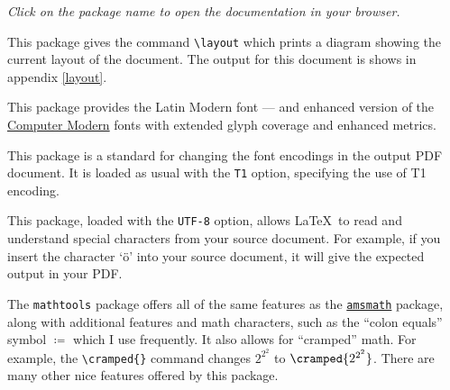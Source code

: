 \documentclass[letterpaper,12pt]{article}
\begin{document}
\begin{center}
\textsl{Click on the package name to open the documentation in your browser.}
\end{center}

\bigskip

\begin{description}[align=margin,labelsep=0pt,leftmargin=0pt,style=multiline,labelwidth=63pt]

{}
\item[\href{http://mirror.utexas.edu/ctan/macros/latex/required/tools/layout.pdf}{\texttt{layout}}] This package gives the command \verb|\layout| which prints a diagram showing the current layout of the document. The output for this document is shows in appendix \ref{layout}.


{}
\item[\href{http://www.ctan.org/tex-archive/fonts/lm/}{\texttt{lmodern}}]
This package provides the Latin Modern font --- and enhanced version of the \href{http://www.ctan.org/tex-archive/fonts/cm/}{Computer Modern} fonts with extended glyph coverage and enhanced metrics.


{}
\item[\href{http://www.ctan.org/pkg/fontenc}{\texttt{fontenc}}]
This package is a standard for changing the font encodings in the output PDF document. It is loaded as usual with the \texttt{T1} option, specifying the use of T1 encoding.


{}
\item[\href{http://www.ctan.org/pkg/inputenc}{\texttt{inputenc}}]
This package, loaded with the \texttt{UTF-8} option, allows \LaTeX\ to read and understand special characters from your source document. For example, if you insert the character `ö' into your source document, it will give the expected output in your PDF.


{}
\item[\href{http://get-software.net/macros/latex/contrib/mathtools/mathtools.pdf}{\texttt{mathtools}}] The \texttt{mathtools} package offers all of the same features as the \href{http://mirror.jmu.edu/pub/CTAN/macros/latex/required/amslatex/math/amsldoc.pdf}{\texttt{amsmath}} package, along with additional features and math characters, such as the ``colon equals'' symbol $\coloneqq$ which I use frequently. It also allows for ``cramped'' math. For example, the \verb|\cramped{}| command changes $2^{2^2}$ to $\cramped{2^{2^2}}$. There are many other nice features offered by this package.



\end{description}
\end{document}
